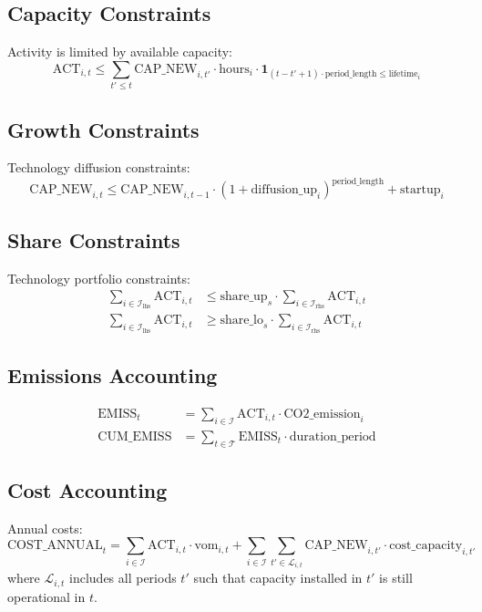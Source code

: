 \documentclass[11pt]{article}
\begin{document}
\subsection{Capacity Constraints}
Activity is limited by available capacity:
\begin{equation}
\text{ACT}_{i,t} \leq \sum_{t' \leq t} \text{CAP\_NEW}_{i,t'} \cdot \text{hours}_i \cdot \mathbf{1}_{(t-t'+1) \cdot \text{period\_length} \leq \text{lifetime}_i}
\end{equation}

\subsection{Growth Constraints}
Technology diffusion constraints:
\begin{equation}
\text{CAP\_NEW}_{i,t} \leq \text{CAP\_NEW}_{i,t-1} \cdot (1 + \text{diffusion\_up}_i)^{\text{period\_length}} + \text{startup}_i
\end{equation}

\subsection{Share Constraints}
Technology portfolio constraints:
\begin{align}
\sum_{i \in \mathcal{I}_{\text{lhs}}} \text{ACT}_{i,t} &\leq \text{share\_up}_s \cdot \sum_{i \in \mathcal{I}_{\text{rhs}}} \text{ACT}_{i,t} \\
\sum_{i \in \mathcal{I}_{\text{lhs}}} \text{ACT}_{i,t} &\geq \text{share\_lo}_s \cdot \sum_{i \in \mathcal{I}_{\text{rhs}}} \text{ACT}_{i,t}
\end{align}

\subsection{Emissions Accounting}
\begin{align}
\text{EMISS}_t &= \sum_{i \in \mathcal{I}} \text{ACT}_{i,t} \cdot \text{CO2\_emission}_i \\
\text{CUM\_EMISS} &= \sum_{t \in \mathcal{T}} \text{EMISS}_t \cdot \text{duration\_period}
\end{align}

\subsection{Cost Accounting}
Annual costs:
\begin{equation}
\text{COST\_ANNUAL}_t = \sum_{i \in \mathcal{I}} \text{ACT}_{i,t} \cdot \text{vom}_{i,t} + \sum_{i \in \mathcal{I}} \sum_{t' \in \mathcal{L}_{i,t}} \text{CAP\_NEW}_{i,t'} \cdot \text{cost\_capacity}_{i,t'}
\end{equation}
where $\mathcal{L}_{i,t}$ includes all periods $t'$ such that capacity installed in $t'$ is still operational in $t$.
\end{document}
